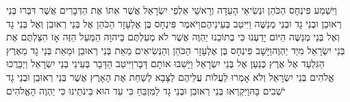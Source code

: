 \documentclass[../main/main.tex]{subfiles}
\begin{document}
\begin{multicols*}{\ncols}
וַיִּשְׁמַע פִּינְחָס הַכֹּהֵן וּנְשִׂיאֵי הָעֵדָה וְרָאשֵׁי אַלְפֵי יִשְׂרָאֵל אֲשֶׁר אִתּוֹ אֶת הַדְּבָרִים אֲשֶׁר דִּבְּרוּ בְּנֵי רְאוּבֵן וּבְנֵי גָד וּבְנֵי מְנַשֶּׁה וַיִּיטַב בְּעֵינֵיהֶם\PreVerseSpace{}וַיֹּאמֶר פִּינְחָס בֶּן אֶלְעָזָר הַכֹּהֵן אֶל בְּנֵי רְאוּבֵן וְאֶל בְּנֵי גָד וְאֶל בְּנֵי מְנַשֶּׁה הַיּוֹם יָדַעְנוּ כִּי בְתוֹכֵנוּ יַהְוֶה אֲשֶׁר לֹא מְעַלְתֶּם בַּיהוָה הַמַּעַל הַזֶּה אָז הִצַּלְתֶּם אֶת בְּנֵי יִשְׂרָאֵל מִיַּד יַהְוֶה\PreVerseSpace{}וַיָּשָׁב פִּינְחָס בֶּן אֶלְעָזָר הַכֹּהֵן וְהַנְּשִׂיאִים מֵאֵת בְּנֵי רְאוּבֵן וּמֵאֵת בְּנֵי גָד מֵאֶרֶץ הַגִּלְעָד אֶל אֶרֶץ כְּנַעַן אֶל בְּנֵי יִשְׂרָאֵל וַיָּשִׁבוּ אוֹתָם דָּבָר\PreVerseSpace{}וַיִּיטַב הַדָּבָר בְּעֵינֵי בְּנֵי יִשְׂרָאֵל וַיְבָרֲכוּ אֱלֹהִים בְּנֵי יִשְׂרָאֵל וְלֹא אָמְרוּ לַעֲלוֹת עֲלֵיהֶם לַצָּבָא לְשַׁחֵת אֶת הָאָרֶץ אֲשֶׁר בְּנֵי רְאוּבֵן וּבְנֵי גָד יֹשְׁבִים בָּהּ\PreVerseSpace{}וַיִּקְרְאוּ בְּנֵי רְאוּבֵן וּבְנֵי גָד לַמִּזְבֵּחַ כִּי עֵד הוּא בֵּינֹתֵינוּ כִּי יַהְוֶה הָאֱלֹהִים\OpenSection{}\par

\end{multicols*}
\end{document}
